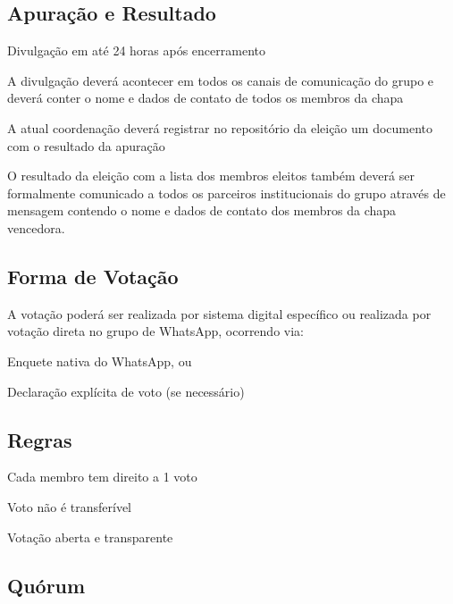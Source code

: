 \documentclass[
  12pt,          %
  a4paper,       %
  oneside,       %
  brazil         %
]{article}
\begin{document}
\subsection{Apuração e Resultado}

\begin{conduta}
	\item Divulgação em até 24 horas após encerramento
	\item A divulgação deverá acontecer em todos os canais de comunicação do grupo e deverá conter o nome e dados de contato de todos os membros da chapa
	\item A atual coordenação deverá registrar no repositório da eleição um documento com o resultado da apuração
	\item O resultado da eleição com a lista dos membros eleitos também deverá ser formalmente comunicado a todos os parceiros institucionais do grupo através de
	mensagem contendo o nome e dados de contato dos membros da chapa vencedora. 
\end{conduta}

\subsection{Forma de Votação}

A votação poderá ser realizada por sistema digital específico ou realizada por votação direta no grupo de WhatsApp, ocorrendo via:

\begin{conduta}
	\item Enquete nativa do WhatsApp, ou
	\item Declaração explícita de voto (se necessário)
\end{conduta}

\subsection{Regras}

\begin{conduta}
	\item Cada membro tem direito a 1 voto
	\item Voto não é transferível
	\item Votação aberta e transparente
\end{conduta}

\subsection{Quórum}
\end{document}
